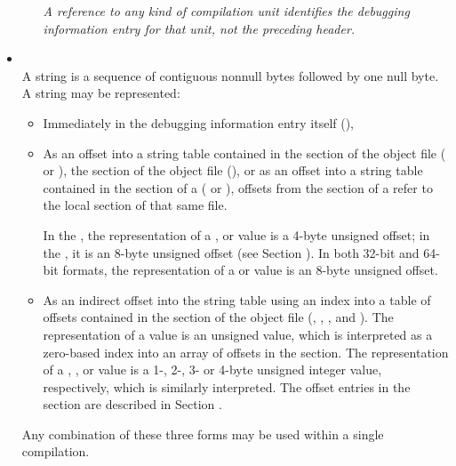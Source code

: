 \begin{itemize}
\begin{itemize}
\textit{A reference to any kind of compilation unit identifies the
debugging information entry for that unit, not the preceding
header.}
\end{itemize}

\item \CLASSstring \\
A string is a sequence of contiguous non\dash null bytes followed by
one null byte. 
A string may be represented: 
\begin{itemize}
\setlength{\itemsep}{0em}
\item Immediately in the debugging information entry itself 
(\DWFORMstringTARG), 

\item As an 
offset into a string table contained in
the \dotdebugstr{} section of the object file (\DWFORMstrpTARG{}
\bb
or \DWFORMstrpeightTARG),
\eb
the \dotdebuglinestr{} section of the object file (\DWFORMlinestrpTARG),
or as an offset into a string table contained in the
\dotdebugstr{} section of a  
(\DWFORMstrpsupTARG{}
\bb
or \DWFORMstrpsupeightTARG),
\eb
\DWFORMstrpsupNAME{} offsets from the \dotdebuginfo{}  
section of a 
refer to the local \dotdebugstr{} section of that same file.

In the \thirtytwobitdwarfformat, the representation of a 
\DWFORMstrpNAME{}, \DWFORMlinestrpNAME{} or \DWFORMstrpsupNAME{}
value is a 4-byte unsigned offset; in the \sixtyfourbitdwarfformat,
it is an 8-byte unsigned offset 
(see Section ).
\bb
In both 32-bit and 64-bit formats, the representation of a 
\DWFORMstrpeight{} or \DWFORMstrpsupeight{} 
value is an 8-byte unsigned offset.
\eb

\item As an indirect offset into the string table using an 
index into a table of offsets contained in the 
\dotdebugstroffsets{} section of the object file 
(\DWFORMstrxTARG, \DWFORMstrxoneTARG, \DWFORMstrxtwoTARG, 
\DWFORMstrxthreeTARG{} and \DWFORMstrxfourTARG).
The representation of a \DWFORMstrxNAME{} value is an unsigned 
 value, which is interpreted as a zero-based 
index into an array of offsets in the \dotdebugstroffsets{} section.
The representation of a \DWFORMstrxoneNAME, \DWFORMstrxtwoNAME, 
\DWFORMstrxthreeNAME{} or \DWFORMstrxfourNAME{} value is a 
1-, 2-, 3- or 4-byte unsigned integer value, respectively,
which is similarly interpreted.
The offset entries in the \dotdebugstroffsets{} section 
\bb
are described in Section .
\eb
\end{itemize}
Any combination of these three forms may be used within a single compilation.


\end{itemize}
